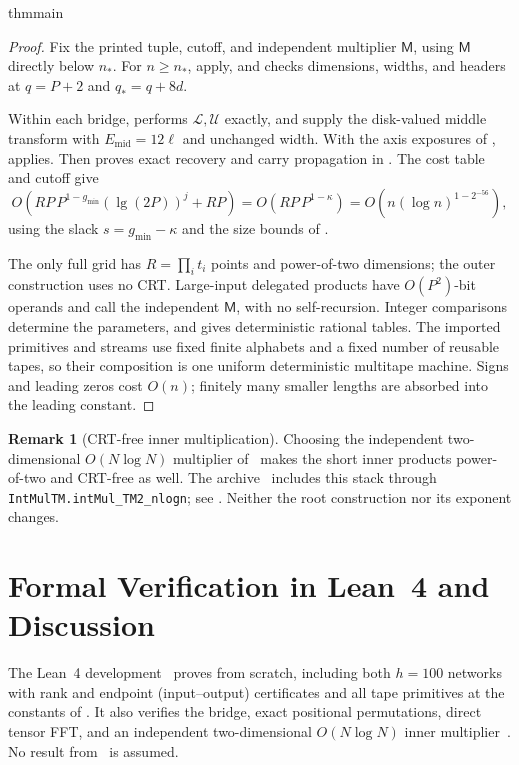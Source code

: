 \documentclass[11pt]{article}
\newcommand{\innercustomthm}{}
\theoremstyle{definition}
\newtheorem{remark}[theorem]{Remark}
\renewcommand{\label}[1]{}%
\newcommand{\restatethm}[2]{%
  \begingroup
  \renewcommand{\innercustomthm}{\ref{#2}}%
  \csname #1\endcsname
  \endgroup
}
\begin{document}
\restatethm{thmmain}{thm:main}
\begin{proof}
Fix the printed tuple, cutoff, and independent multiplier $\mathsf M$, using $\mathsf M$ directly below $n_*$.
For $n\ge n_*$,  apply, and
 checks dimensions, widths, and headers at
$q=P+2$ and $q_*=q+8d$.

Within each bridge,  performs $\mathcal L,\mathcal U$
exactly, and  supply the disk-valued
middle transform with $E_{\mathrm{mid}}=12\ell$ and unchanged width.
With the axis exposures of ,  applies.
Then  proves exact recovery and carry propagation in .
The cost table and cutoff give
\[
 O\!\left(RP\,P^{1-g_{\min}}(\lg(2P))^j+RP\right)
 =O(RP\,P^{1-\kappa})
 =O\!\left(n(\log n)^{1-2^{-56}}\right),
\]
using the slack $s=g_{\min}-\kappa$ and the size bounds of .

The only full grid has $R=\prod_i t_i$ points and power-of-two dimensions; the outer construction uses no CRT.
Large-input delegated products have $O(P^2)$-bit operands and call the independent $\mathsf M$, with no self-recursion.
Integer comparisons determine the parameters, and  gives deterministic rational tables.
The imported primitives and streams use fixed finite alphabets and a fixed number of reusable tapes, so their composition is one uniform deterministic multitape machine.
Signs and leading zeros cost $O(n)$; finitely many smaller lengths are absorbed into the leading constant.
\end{proof}

\begin{remark}[CRT-free inner multiplication]\label{rem:crt-free}
Choosing the independent two-dimensional $O(N\log N)$ multiplier of~\cite{MS}
makes the short inner products power-of-two and CRT-free as well.
The archive~\cite{Lean26} includes this stack through
\texttt{IntMulTM.\allowbreak intMul\_TM2\_\allowbreak nlogn};
see . Neither the root construction nor its exponent changes.
\end{remark}


\section{Formal Verification in Lean~4 and Discussion}\label{sec:lean}

The Lean~4 development~\cite{dMU21,mC20,Lean26} proves 
from scratch, including both $h=100$ networks with rank and endpoint
(input--output) certificates and all tape primitives at the constants of
.
It also verifies the bridge, exact positional permutations, direct tensor FFT,
and an independent two-dimensional $O(N\log N)$ inner multiplier~\cite{MS}.
No result from~\cite{OAI26,HvdH21} is assumed.
\end{document}
